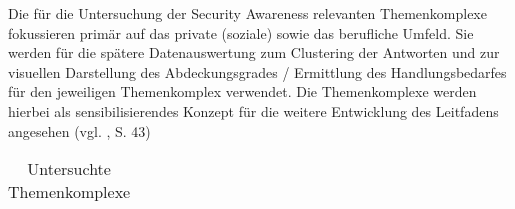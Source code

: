 \documentclass[../../main.tex]{subfiles}
\begin{document}
\begin{sloppypar}
Die für die Untersuchung der Security Awareness relevanten Themenkomplexe fokussieren primär auf das private (soziale) sowie das berufliche Umfeld. Sie werden für die spätere Datenauswertung zum Clustering der Antworten und zur visuellen Darstellung des Abdeckungsgrades / Ermittlung des Handlungsbedarfes für den jeweiligen Themenkomplex verwendet. Die Themenkomplexe werden hierbei als sensibilisierendes Konzept für die weitere Entwicklung des Leitfadens angesehen (vgl. \citeauthor{mayer_interview_2013} \citeyear{mayer_interview_2013}, S. 43) 
\end{sloppypar}



\sloppy 

\begin{table}[H]
\tablefontsize	
\centering
\caption{Untersuchte Themenkomplexe}
\label{themenbereiche}

\begin{tabular}{ |p{4cm}|p{10.5cm}|p{2.0cm}|p{1.5cm}|}


\end{tabular}
\end{table}
\end{document}
